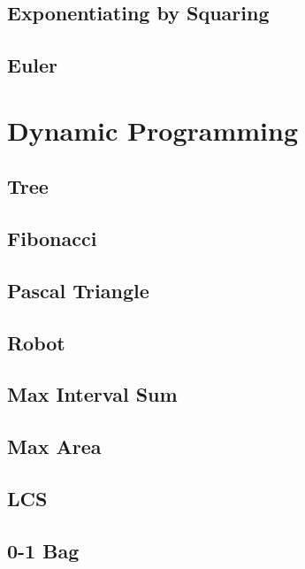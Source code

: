    \subsection{Exponentiating by Squaring}
        
    \subsection{Euler}
        

\section{Dynamic Programming}
    \subsection{Tree}
        
    \subsection{Fibonacci}
            
    \subsection{Pascal Triangle}
        
    \subsection{Robot}
        
    \subsection{Max Interval Sum}
        
    \subsection{Max Area}
        
    \subsection{LCS}
        
    \subsection{0-1 Bag}
        
